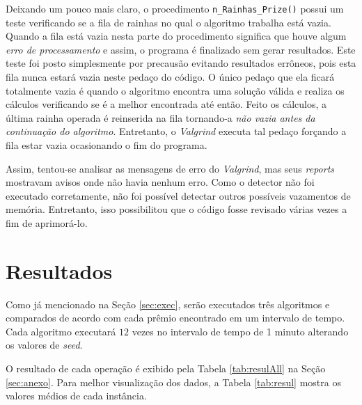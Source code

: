 \documentclass[12pt]{article}
\begin{document}
		Deixando um pouco mais claro, o procedimento \verb|n_Rainhas_Prize()| possui um teste verificando se a fila de rainhas no qual o algoritmo trabalha está vazia. Quando a fila está vazia nesta parte do procedimento significa que houve algum \textit{erro de processamento} e assim, o programa é finalizado sem gerar resultados. Este teste foi posto simplesmente por precausão evitando resultados errôneos, pois esta fila nunca estará vazia neste pedaço do código.
		O único pedaço que ela ficará totalmente vazia é quando o algoritmo encontra uma solução válida e realiza os cálculos verificando se é a melhor encontrada até então. Feito os cálculos, a última rainha operada é reinserida na fila tornando-a \textit{não vazia antes da continuação do algoritmo}. Entretanto, o \textit{Valgrind} executa tal pedaço forçando a fila estar vazia ocasionando o fim do programa.

		Assim, tentou-se analisar as mensagens de erro do \textit{Valgrind}, mas seus \textit{reports} mostravam avisos onde não havia nenhum erro. Como o detector não foi executado corretamente, não foi possível detectar outros possíveis vazamentos de memória. Entretanto, isso possibilitou que o código fosse revisado várias vezes a fim de aprimorá-lo.

\section{Resultados}
	Como já mencionado na Seção \ref{sec:exec}, serão executados três algoritmos e comparados de acordo com cada prêmio encontrado em um intervalo de tempo. Cada algoritmo executará $ 12 $ vezes no intervalo de tempo de 1 minuto alterando os valores de \textit{seed}.

	O resultado de cada operação é exibido pela Tabela \ref{tab:resulAll} na Seção \ref{sec:anexo}. Para melhor visualização dos  dados, a Tabela \ref{tab:resul} mostra os valores médios de cada instância.
\end{document}
